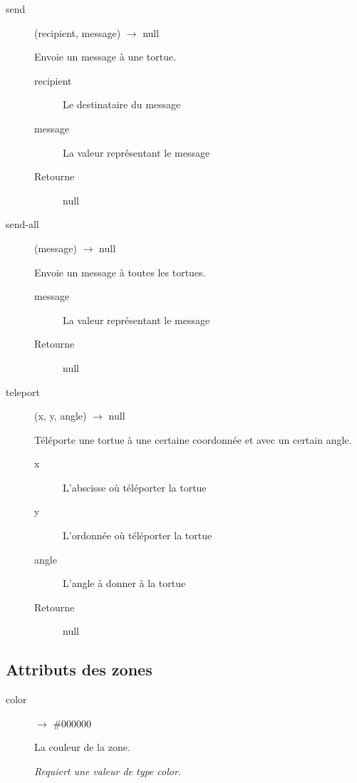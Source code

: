 \begin{description}
	\item[send] (recipient, message) $\rightarrow$ null

	Envoie un message à une tortue.

	\begin{description}
		\item[recipient] Le destinataire du message
		\item[message] La valeur représentant le message
		\item[Retourne] null
	\end{description}

	\item[send-all] (message) $\rightarrow$ null

	Envoie un message à toutes les tortues.

	\begin{description}
		\item[message] La valeur représentant le message
		\item[Retourne] null
	\end{description}

	\item[teleport] (x, y, angle) $\rightarrow$ null

	Téléporte une tortue à une certaine coordonnée et avec un certain angle.

	\begin{description}
		\item[x] L'abscisse où téléporter la tortue
		\item[y] L'ordonnée où téléporter la tortue
		\item[angle] L'angle à donner à la tortue
		\item[Retourne] null
	\end{description}
\end{description}

\subsection{Attributs des zones}

\begin{description}
	\item[color] $\rightarrow$ \#000000

	La couleur de la zone.

	\emph{Requiert une valeur de type color.}
\end{description}

